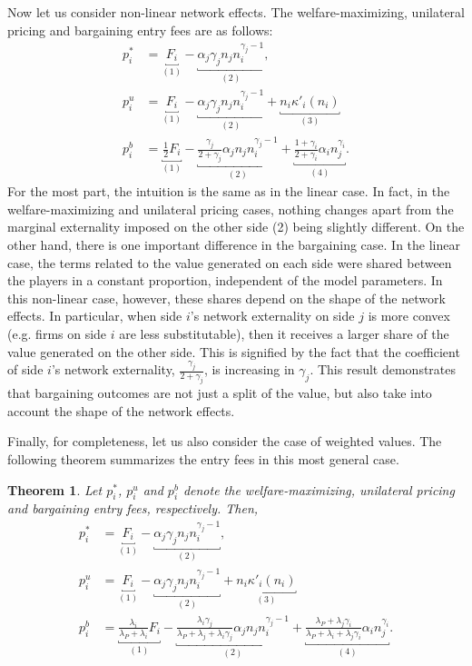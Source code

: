 \documentclass[a4paper]{article}
\newtheorem{theorem}{Theorem}
\begin{document}
Now let us consider non-linear network effects.
The welfare-maximizing, unilateral pricing and bargaining entry fees are as follows:
\begin{align*}
    p_i^* &= \underbracket{F_i}_{(1)} - \underbracket{\alpha_j \gamma_j n_j n_i^{\gamma_j - 1}}_{(2)}, \\
    p_i^u &= \underbracket{F_i}_{(1)} - \underbracket{\alpha_j \gamma_j n_j n_i^{\gamma_j - 1}}_{(2)} + \underbracket{n_i \kappa'_i(n_i)}_{(3)} \\
    p_i^b &= \underbracket{\frac{1}{2} F_i}_{(1)} - \underbracket{\frac{\gamma_j}{2 + \gamma_j} \alpha_j n_j n_i^{\gamma_j - 1}}_{(2)} + \underbracket{\frac{1 + \gamma_i}{2 + \gamma_i} \alpha_i n_j^{\gamma_i}}_{(4)}.
\end{align*}
For the most part, the intuition is the same as in the linear case.
In fact, in the welfare-maximizing and unilateral pricing cases, nothing changes apart from the marginal externality imposed on the other side (2) being slightly different.
On the other hand, there is one important difference in the bargaining case.
In the linear case, the terms related to the value generated on each side were shared between the players in a constant proportion, independent of the model parameters.
In this non-linear case, however, these shares depend on the shape of the network effects.
In particular, when side $i$'s network externality on side $j$ is more convex (e.g. firms on side $i$ are less substitutable), then it receives a larger share of the value generated on the other side.
This is signified by the fact that the coefficient of side $i$'s network externality, $\frac{\gamma_j}{2 + \gamma_j}$, is increasing in $\gamma_j$.
This result demonstrates that bargaining outcomes are not just a split of the value, but also take into account the shape of the network effects.

Finally, for completeness, let us also consider the case of weighted values.
The following theorem summarizes the entry fees in this most general case.
\begin{theorem}
    \label{prop:all_entry_fees}
    Let $p_i^*$, $p_i^u$ and $p_i^b$ denote the welfare-maximizing, unilateral pricing and bargaining entry fees, respectively.
    Then,
    \begin{align*}
        p_i^* &= \underbracket{F_i}_{(1)} - \underbracket{\alpha_j \gamma_j n_j n_i^{\gamma_j - 1}}_{(2)}, \\
        p_i^u &= \underbracket{F_i}_{(1)} - \underbracket{\alpha_j \gamma_j n_j n_i^{\gamma_j - 1}}_{(2)} + \underbracket{n_i \kappa'_i(n_i)}_{(3)} \\
        p_i^b &= \underbracket{\frac{\lambda_i}{\lambda_P + \lambda_i} F_i}_{(1)} - \underbracket{\frac{\lambda_i \gamma_j}{\lambda_P + \lambda_j + \lambda_i\gamma_j} \alpha_j n_j n_i^{\gamma_j - 1}}_{(2)} + \underbracket{\frac{\lambda_P + \lambda_j\gamma_i}{\lambda_P + \lambda_i + \lambda_j\gamma_i} \alpha_i n_j^{\gamma_i}}_{(4)}.
    \end{align*}
\end{theorem}
\end{document}
